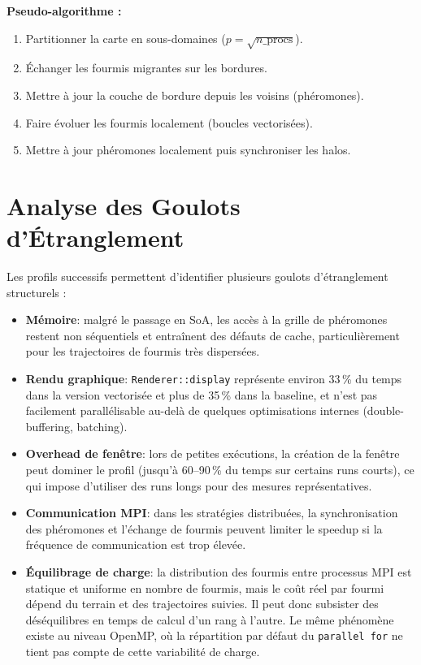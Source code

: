\documentclass[12pt,a4paper]{article}
\begin{document}
\textbf{Pseudo-algorithme :}
\begin{enumerate}
    \item Partitionner la carte en sous-domaines ($p = \sqrt{n\_\text{procs}}$).
    \item Échanger les fourmis migrantes sur les bordures.
    \item Mettre à jour la couche de bordure depuis les voisins (phéromones).
    \item Faire évoluer les fourmis localement (boucles vectorisées).
    \item Mettre à jour phéromones localement puis synchroniser les halos.
\end{enumerate}

\section{Analyse des Goulots d'Étranglement}
\label{sec:bottlenecks}

Les profils successifs permettent d'identifier plusieurs goulots d'étranglement structurels :

\begin{itemize}
    \item[$\circ$] \textbf{Mémoire}: malgré le passage en SoA, les accès à la grille de phéromones restent non séquentiels et entraînent des défauts de cache, particulièrement pour les trajectoires de fourmis très dispersées.
    \item[$\circ$] \textbf{Rendu graphique}: \texttt{Renderer::display} représente environ 33\,\% du temps dans la version vectorisée et plus de 35\,\% dans la baseline, et n'est pas facilement parallélisable au-delà de quelques optimisations internes (double-buffering, batching).
    \item[$\circ$] \textbf{Overhead de fenêtre}: lors de petites exécutions, la création de la fenêtre peut dominer le profil (jusqu'à 60--90\,\% du temps sur certains runs courts), ce qui impose d'utiliser des runs longs pour des mesures représentatives.
    \item[$\circ$] \textbf{Communication MPI}: dans les stratégies distribuées, la synchronisation des phéromones et l'échange de fourmis peuvent limiter le speedup si la fréquence de communication est trop élevée.
    \item[$\circ$] \textbf{Équilibrage de charge}: la distribution des fourmis entre processus MPI est statique et uniforme en nombre de fourmis, mais le coût réel par fourmi dépend du terrain et des trajectoires suivies. Il peut donc subsister des déséquilibres en temps de calcul d'un rang à l'autre. Le même phénomène existe au niveau OpenMP, où la répartition par défaut du \texttt{parallel for} ne tient pas compte de cette variabilité de charge.

\end{itemize}
\end{document}
